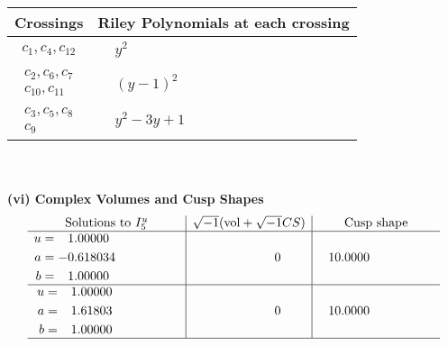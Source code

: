 \documentclass[1p]{elsarticle_modified}
\theoremstyle{definition}
\newcommand{\I}{\sqrt{-1}}
\begin{document}
\begin{tabular}{m{50pt}|m{274pt}}
Crossings & \hspace{64pt}Riley Polynomials at each crossing \\
\hline $$\begin{aligned}c_{1},c_{4},c_{12}\end{aligned}$$&$\begin{aligned}
&y^2
\end{aligned}$\\
\hline $$\begin{aligned}c_{2},c_{6},c_{7}\\c_{10},c_{11}\end{aligned}$$&$\begin{aligned}
&(y-1)^2
\end{aligned}$\\
\hline $$\begin{aligned}c_{3},c_{5},c_{8}\\c_{9}\end{aligned}$$&$\begin{aligned}
&y^2-3 y+1
\end{aligned}$\\
\hline
\end{tabular}\\~\\
\newpage\flushleft \textbf{(vi) Complex Volumes and Cusp Shapes}
$$\begin{array}{c|c|c}  
\text{Solutions to }I^u_{5}& \I (\text{vol} + \sqrt{-1}CS) & \text{Cusp shape}\\
 \hline 
\begin{aligned}
u &= \phantom{-}1.00000\phantom{ +0.000000I} \\
a &= -0.618034\phantom{ +0.000000I} \\
b &= \phantom{-}1.00000\phantom{ +0.000000I}\end{aligned}
 & \phantom{-0.000000 } 0 & \phantom{-}10.0000\phantom{ +0.000000I} \\ \hline\begin{aligned}
u &= \phantom{-}1.00000\phantom{ +0.000000I} \\
a &= \phantom{-}1.61803\phantom{ +0.000000I} \\
b &= \phantom{-}1.00000\phantom{ +0.000000I}\end{aligned}
 & \phantom{-0.000000 } 0 & \phantom{-}10.0000\phantom{ +0.000000I}\\
 \hline 
 \end{array}$$\newpage\newpage\renewcommand{\arraystretch}{1}
\end{document}
